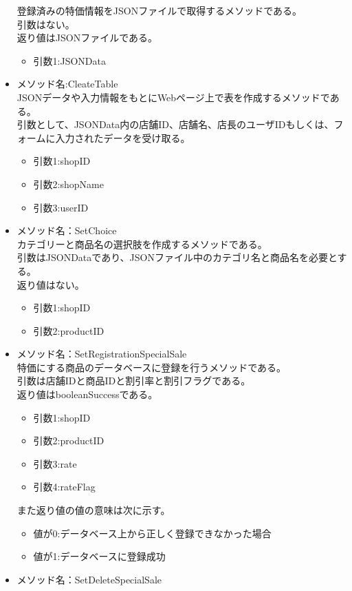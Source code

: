 \documentclass[a4j]{jarticle}
\begin{document}
\begin{itemize}
登録済みの特価情報をJSONファイルで取得するメソッドである。\\
引数はない。\\
返り値はJSONファイルである。


	\begin{itemize}
		\item 引数1:JSONData
	\end{itemize}
	\item メソッド名:CleateTable\\
JSONデータや入力情報をもとにWebページ上で表を作成するメソッドである。\\
引数として、JSONData内の店舗ID、店舗名、店長のユーザIDもしくは、フォームに入力されたデータを受け取る。
	\begin{itemize}	
		\item 引数1:shopID
		\item 引数2:shopName
		\item 引数3:userID
	\end{itemize}
\item メソッド名：SetChoice\\

カテゴリーと商品名の選択肢を作成するメソッドである。\\
引数はJSONDataであり、JSONファイル中のカテゴリ名と商品名を必要とする。\\
返り値はない。
	\begin{itemize}
		\item 引数1:shopID
		\item 引数2:productID
	\end{itemize}
			
\item メソッド名：SetRegistrationSpecialSale\\

特価にする商品のデータベースに登録を行うメソッドである。\\
引数は店舗IDと商品IDと割引率と割引フラグである。\\
返り値はbooleanSuccessである。
	\begin{itemize}
		\item 引数1:shopID
		\item 引数2:productID
		\item 引数3:rate
		\item 引数4:rateFlag
	\end{itemize}
また返り値の値の意味は次に示す。
	\begin{itemize}
		\item 値が0:データベース上から正しく登録できなかった場合
		\item 値が1:データベースに登録成功
	\end{itemize}
%
\item メソッド名：SetDeleteSpecialSale\\


\end{itemize}
\end{document}
